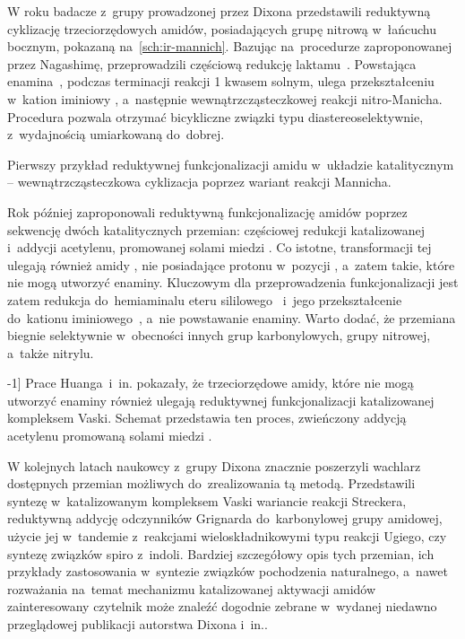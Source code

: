 W roku \citeyear{gregory15} badacze z~grupy prowadzonej przez Dixona przedstawili reduktywną
  cyklizację trzeciorzędowych amidów, posiadających grupę nitrową w~łańcuchu
  bocznym, pokazaną na~\cref{sch:ir-mannich}.
Bazując na~procedurze zaproponowanej przez Nagashimę, przeprowadzili częściową redukcję
  laktamu~.
Powstająca enamina~, podczas terminacji reakcji \SI{1}{\Molar} kwasem solnym,
  ulega przekształceniu w~kation iminiowy , a~następnie wewnątrzcząsteczkowej
  reakcji nitro-Manicha.
Procedura pozwala otrzymać bicykliczne związki typu  diastereoselektywnie,
  z~wydajnością umiarkowaną do~dobrej.
\begin{scheme*}
  
  \caption{
    Pierwszy przykład reduktywnej funkcjonalizacji amidu w~układzie katalitycznym \---
      wewnątrzcząsteczkowa cyklizacja poprzez wariant reakcji Mannicha.
  }
  \label{sch:ir-mannich}
\end{scheme*}

Rok później \citeauthor{huang16c} zaproponowali reduktywną funkcjonalizację amidów poprzez
  sekwencję dwóch katalitycznych przemian: częściowej redukcji katalizowanej \vaska{} i~addycji
  acetylenu, promowanej solami miedzi .
Co istotne, transformacji tej ulegają również amidy , nie posiadające
  protonu w~pozycji \textalpha{}, a~zatem takie, które nie mogą utworzyć enaminy.
Kluczowym dla przeprowadzenia funkcjonalizacji jest zatem redukcja do~hemiaminalu eteru
  sililowego~ i~jego przekształcenie do~kationu iminiowego~,
  a~nie powstawanie enaminy.
Warto dodać, że przemiana biegnie selektywnie w~obecności innych grup karbonylowych, grupy
  nitrowej, a~także nitrylu.
\begin{scheme*}[b]
  
  \caption[][-1\baselineskip]{
    Prace Huanga~i~in. pokazały, że trzeciorzędowe amidy, które nie mogą utworzyć enaminy
      również ulegają reduktywnej funkcjonalizacji katalizowanej kompleksem Vaski.
    Schemat przedstawia ten proces, zwieńczony addycją acetylenu promowaną solami miedzi .
  }
  \label{sch:ir-cu-activation}
\end{scheme*}

W kolejnych latach naukowcy z~grupy Dixona znacznie poszerzyli wachlarz dostępnych przemian
  możliwych do~zrealizowania tą metodą.
Przedstawili syntezę  w~katalizowanym kompleksem Vaski wariancie reakcji
  Streckera,
  reduktywną addycję odczynników Grignarda do~karbonylowej grupy amidowej,
  użycie jej w~tandemie z~reakcjami wieloskładnikowymi typu reakcji Ugiego,
  czy syntezę związków spiro z~indoli.
Bardziej szczegółowy opis tych przemian, ich przykłady zastosowania w~syntezie związków pochodzenia
  naturalnego, a~nawet rozważania na~temat mechanizmu katalizowanej \vaska{} aktywacji amidów
  zainteresowany czytelnik może znaleźć dogodnie zebrane w~wydanej niedawno przeglądowej
  publikacji autorstwa Dixona i~in..

